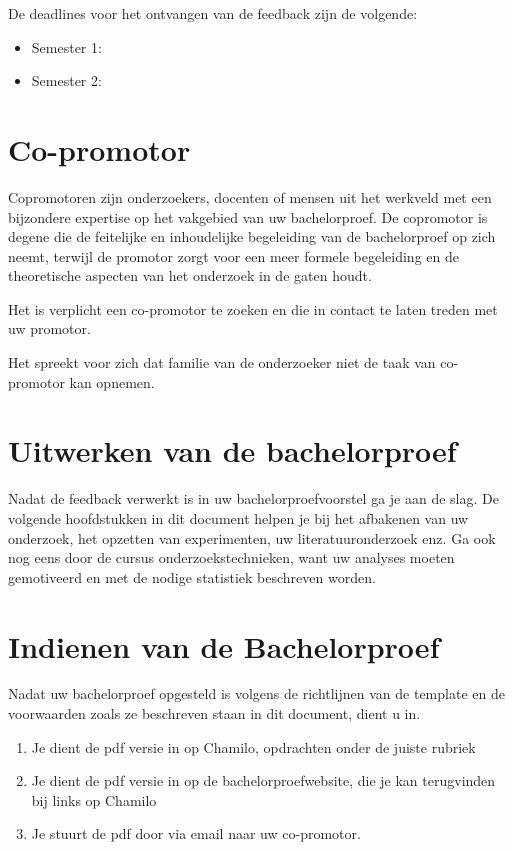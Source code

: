 De deadlines voor het ontvangen van de feedback zijn de volgende:
\begin{framed}
\begin{itemize}
	\item Semester 1: \feedbackVoorstelSemEen{}
	\item Semester 2: \feedbackVoorstelSemTwee{}
\end{itemize}
\end{framed}

\section{Co-promotor}
Copromotoren zijn onderzoekers, docenten of mensen uit het werkveld met een bijzondere expertise op het vakgebied van uw bachelorproef. De copromotor is degene die de feitelijke en inhoudelijke begeleiding van de bachelorproef op zich neemt, terwijl de promotor zorgt voor een meer formele begeleiding en de theoretische aspecten van het onderzoek in de gaten houdt. 

\begin{framed}
Het is verplicht een co-promotor te zoeken en die in contact te laten treden met uw promotor. 

Het spreekt voor zich dat familie van de onderzoeker niet de taak van co-promotor kan opnemen.
\end{framed}

\section{Uitwerken van de bachelorproef}
Nadat de feedback verwerkt is in uw bachelorproefvoorstel ga je aan de slag. De volgende hoofdstukken in dit document helpen je bij het afbakenen van uw onderzoek, het opzetten van experimenten, uw literatuuronderzoek enz. Ga ook  nog eens door de cursus onderzoekstechnieken, want uw analyses moeten gemotiveerd en met de nodige statistiek beschreven worden.

\section{Indienen van de Bachelorproef}
Nadat uw bachelorproef opgesteld is volgens de richtlijnen van de template en de voorwaarden zoals ze beschreven staan in dit document, dient u in.
\begin{enumerate}
	\item Je dient de pdf versie in op Chamilo, opdrachten onder de juiste rubriek 
	\item Je dient de pdf versie in op de bachelorproefwebsite, die je kan terugvinden bij links op Chamilo 
	\item Je stuurt de pdf door via email naar uw co-promotor. 
\end{enumerate}

